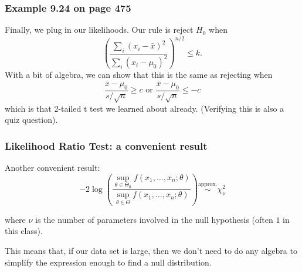 \documentclass{beamer}
\begin{document}
\begin{frame}
\frametitle{Example 9.24 on page 475}

Finally, we plug in our likelihoods. Our rule is reject $H_0$ when 
\[
\left(\frac{\sum_i(x_i - \bar{x})^2 }{\sum_i(x_i - \mu_0)^2 } \right)^{n/2} \le k.
\]
With a bit of algebra, we can show that this is the same as rejecting when 
\[
\frac{\bar{x} - \mu_0}{s/\sqrt{n}} \ge c \text{ or } \frac{\bar{x} - \mu_0}{s/\sqrt{n}} \le -c
\]
which is that 2-tailed t test we learned about already. (Verifying this is also a quiz question).

\end{frame}


\begin{frame}
\frametitle{Likelihood Ratio Test: a convenient result}

Another convenient result:
\[
-2 \log \left( \frac{ \sup_{\theta \in \Theta_0} f(x_1, \ldots, x_n ; \theta)}{ \sup_{\theta \in \Theta} f(x_1, \ldots, x_n ; \theta)}\right)  \overset{\text{approx.}}{\sim} \chi^2_{\nu}
\]

where $\nu$ is the number of parameters involved in the null hypothesis (often $1$ in this class).
\newline

This means that, if our data set is large, then we don't need to do any algebra to simplify the expression enough to find a null distribution.


\end{frame}
\end{document}

